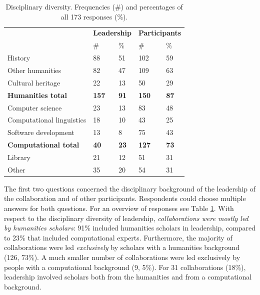 \documentclass{article}
\begin{document}
\begin{table}
\centering
\caption{Disciplinary diversity. Frequencies (\#) and percentages of all 173 responses (\%).}
\label{table:discdiversity}
\begin{tabular}{@{}lllll@{}}
\toprule
\multirow{2}{*}{}            & \multicolumn{2}{l}{\textbf{Leadership}} & \multicolumn{2}{l}{\textbf{Participants}} \\
                             & \#          & \%                 & \#           & \%                  \\ \midrule
History                      & 88                 & 51               & 102                 & 59                \\
Other humanities             & 82                 & 47               & 109                 & 63                \\
Cultural heritage            & 22                 & 13               & 50                  & 29                \\
\textbf{Humanities total}    & \textbf{157}       & \textbf{91}      & \textbf{150}        & \textbf{87}       \\ \midrule
Computer science             & 23                 & 13               & 83                  & 48                \\
Computational linguistics    & 18                 & 10               & 43                  & 25                \\
Software development         & 13                 & 8                & 75                  & 43                \\
\textbf{Computational total} & \textbf{40}        & \textbf{23}      & \textbf{127}        & \textbf{73}       \\ \midrule
Library                      & 21                  &       12           & 51                  & 31             \\
Other                        & 35                 & 20                 & 54                  & 31              \\  
\bottomrule
\end{tabular}
\end{table}

The first two questions concerned the disciplinary background of the leadership of the collaboration and of other participants. Respondents could choose multiple answers for both questions.
For an overview of responses see Table \ref{table:discdiversity}.
With respect to the disciplinary diversity of leadership, \textit{collaborations were mostly led by humanities scholars}: 91\% included humanities scholars in leadership, compared to 23\% that included computational experts.
Furthermore, the majority of collaborations were led \textit{exclusively} by scholars with a humanities background (126, 73\%). A much smaller number of collaborations were led exclusively by people with a computational background (9, 5\%). For 31 collaborations (18\%), leadership involved scholars both from the humanities and from a computational background.
\end{document}
